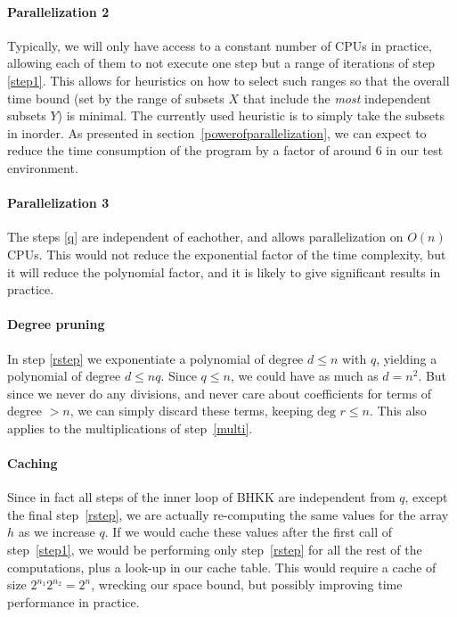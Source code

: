 \documentclass{cslthse-msc}
\begin{document}
\paragraph{Parallelization 2}\label{parallelization2} Typically, we will only have access to a constant number of CPUs in practice, allowing each of them to not execute one step but a range of iterations of step \ref{step1}. This allows for heuristics on how to select such ranges so that the overall time bound (set by the range of subsets $X$ that include the \emph{most} independent subsets $Y$) is minimal. The currently used heuristic is to simply take the subsets in inorder. As presented in section~\ref{powerofparallelization}, we can expect to reduce the time consumption of the program by a factor of around 6 in our test environment.

\paragraph{Parallelization 3} The steps \ref{q} are independent of eachother, and allows parallelization on $O(n)$ CPUs. This would not reduce the exponential factor of the time complexity, but it will reduce the polynomial factor, and it is likely to give significant results in practice.

\paragraph{Degree pruning} In step \ref{rstep} we exponentiate a polynomial of degree $d \leq n$ with $q$, yielding a polynomial of degree $d \leq nq$. Since $q \leq n$, we could have as much as $d = n^2$. But since we never do any divisions, and never care about coefficients for terms of degree $> n$, we can simply discard these terms, keeping $\text{deg } r \leq n$. This also applies to the multiplications of step~\ref{multi}.

\paragraph{Caching} Since in fact all steps of the inner loop of BHKK are independent from $q$, except the final step~\ref{rstep}, we are actually re-computing the same values for the array $h$ as we increase $q$. If we would cache these values after the first call of step~\ref{step1}, we would be performing only step~\ref{rstep} for all the rest of the computations, plus a look-up in our cache table. This would require a cache of size $2^{n_1} 2^{n_2} = 2^n$, wrecking our space bound, but possibly improving time performance in practice.
\end{document}
